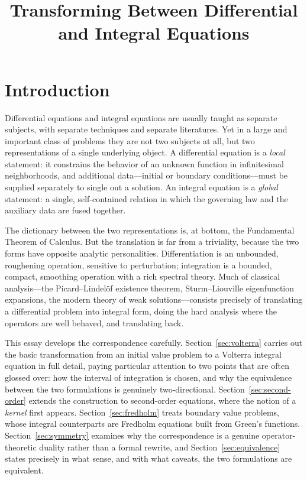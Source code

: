 \documentclass{essay}
\title{Transforming Between Differential and Integral Equations}
\author{}
\date{}
\begin{document}
\maketitle

\section{Introduction}

Differential equations and integral equations are usually taught as separate subjects, with separate techniques and separate literatures. Yet in a large and important class of problems they are not two subjects at all, but two representations of a single underlying object. A differential equation is a \emph{local} statement: it constrains the behavior of an unknown function in infinitesimal neighborhoods, and additional data---initial or boundary conditions---must be supplied separately to single out a solution. An integral equation is a \emph{global} statement: a single, self-contained relation in which the governing law and the auxiliary data are fused together.

The dictionary between the two representations is, at bottom, the Fundamental Theorem of Calculus. But the translation is far from a triviality, because the two forms have opposite analytic personalities. Differentiation is an unbounded, roughening operation, sensitive to perturbation; integration is a bounded, compact, smoothing operation with a rich spectral theory. Much of classical analysis---the Picard--Lindel\"of existence theorem, Sturm--Liouville eigenfunction expansions, the modern theory of weak solutions---consists precisely of translating a differential problem into integral form, doing the hard analysis where the operators are well behaved, and translating back.

This essay develops the correspondence carefully. Section~\ref{sec:volterra} carries out the basic transformation from an initial value problem to a Volterra integral equation in full detail, paying particular attention to two points that are often glossed over: how the interval of integration is chosen, and why the equivalence between the two formulations is genuinely two-directional. Section~\ref{sec:second-order} extends the construction to second-order equations, where the notion of a \emph{kernel} first appears. Section~\ref{sec:fredholm} treats boundary value problems, whose integral counterparts are Fredholm equations built from Green's functions. Section~\ref{sec:symmetry} examines why the correspondence is a genuine operator-theoretic duality rather than a formal rewrite, and Section~\ref{sec:equivalence} states precisely in what sense, and with what caveats, the two formulations are equivalent.
\end{document}
